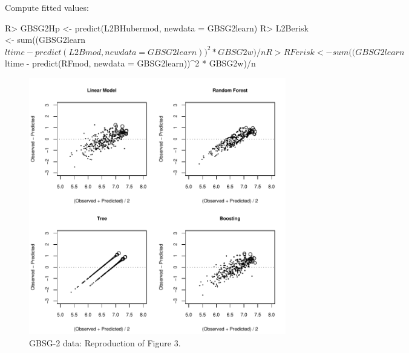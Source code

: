 \documentclass{article}
\newenvironment{Schunk}{}{}
\begin{document}
Compute fitted values:
\begin{Schunk}
\begin{Sinput}
R> GBSG2Hp <- predict(L2BHubermod, newdata = GBSG2learn)
R> L2Berisk <- sum((GBSG2learn$ltime - predict(L2Bmod, 
         newdata = GBSG2learn))^2 * GBSG2w)/n
R> RFerisk <- sum((GBSG2learn$ltime - predict(RFmod, 
         newdata = GBSG2learn))^2 * GBSG2w)/n
\end{Sinput}
\end{Schunk}

\begin{figure}
\begin{center}
\includegraphics{SurvivalEnsembles-Figure3}
\caption{GBSG-2 data: Reproduction of Figure 3.}
\end{center}
\end{figure}
\end{document}
